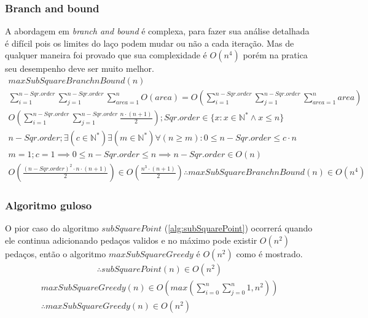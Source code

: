 \documentclass[10.9pt]{article}
\begin{document}
\subsubsection{Branch and bound}
\label{sec:org24f68a9}
A abordagem em \emph{branch and bound} é complexa, para fazer sua análise detalhada é difícil pois os limites do laço podem mudar ou não a cada iteração. Mas de qualquer maneira foi provado que sua complexidade é \(O(n^4)\) porém na pratica seu desempenho deve ser muito melhor.
\begin{equation}
  \begin{aligned}
    maxSubSquareBranchnBound(n)\\
    \sum_{i=1}^{n-Sqr.order}\sum_{j=1}^{n-Sqr.order}\sum_{area=1}^{n} O(area)=O(\sum_{i=1}^{n-Sqr.order}\sum_{j=1}^{n-Sqr.order}\sum_{area=1}^{n} area) \\
    O(\sum_{i=1}^{n-Sqr.order}\sum_{j=1}^{n-Sqr.order} \frac{n\cdot (n+1)}{2}); Sqr.order \in \{x : x \in \mathbb{N^{*}} \land  x \leq n\}\\
    n-Sqr.order; \exists (c \in \mathbb{N^{*}}) \exists (m \in \mathbb{N^{*}}) \forall (n \geq m) : 0 \leq n-Sqr.order \leq c\cdot n\\
    m = 1; c = 1 \implies 0 \leq n-Sqr.order \leq n \implies n-Sqr.order \in O(n)\\
    O(\frac{(n-Sqr.order)^2\cdot n\cdot (n+1)}{2}) \in  O(\frac{n^3\cdot (n+1)}{2}) \therefore maxSubSquareBranchnBound(n) \in O(n^4)
  \end{aligned}
\end{equation}

\subsubsection{Algoritmo guloso}
\label{sec:org22f8e4a}
O pior caso do algoritmo \(subSquarePoint\) (\ref{alg:subSquarePoint}) ocorrerá quando ele continua adicionando pedaços validos e no máximo pode existir \(O(n^2)\) pedaços, então o algoritmo \(maxSubSquareGreedy\) é \(O(n^2)\) como é mostrado.
\begin{equation}
  \begin{aligned}\label{eq:subSquarePoint}
    \therefore subSquarePoint(n) \in O(n^2)
  \end{aligned}
\end{equation}
\begin{equation}
  \begin{aligned}\label{eq:maxSubSquareGreedy}
  maxSubSquareGreedy(n)\in O(max(\sum_{i=0}^{n}\sum_{j=0}^{n} 1,n^2))\\
    \therefore maxSubSquareGreedy(n) \in O(n^2)
  \end{aligned}
\end{equation}
\end{document}
